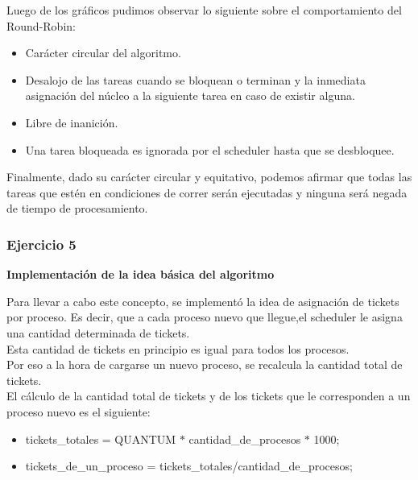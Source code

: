\indent Luego de los gráficos pudimos observar lo siguiente sobre el comportamiento  del Round-Robin:\\
\begin{itemize}
\item  Carácter circular del algoritmo.
\item  Desalojo de las tareas cuando se bloquean o terminan y la inmediata asignación del núcleo a la siguiente tarea en caso de existir alguna.
\item  Libre de inanición.
\item  Una tarea bloqueada es ignorada por el scheduler hasta que se desbloquee.
\end{itemize}

\indent Finalmente, dado su carácter circular y equitativo, podemos afirmar que todas las tareas que 
estén en condiciones de correr serán ejecutadas y ninguna será negada de tiempo de procesamiento.\\

\subsubsection[Resolución Ejercicio 5]{Ejercicio 5}

\begin{center}
\textbf{Implementación de la idea básica del algoritmo} 
\end{center}


\indent Para llevar a cabo este concepto, se implementó la idea de asignación de tickets por proceso. 
Es decir, que a cada proceso nuevo que llegue,el scheduler le asigna una cantidad determinada de tickets. \\
Esta cantidad de tickets en principio es igual para todos los procesos.\\
Por eso a la hora de cargarse un nuevo proceso, se recalcula la cantidad total de tickets.\\

\indent El cálculo de la cantidad total de tickets y de los tickets que le corresponden a un proceso nuevo es el siguiente:\\
\begin{itemize}
 \item tickets\_totales = QUANTUM $*$ cantidad\_de\_procesos $*$ 1000;
 \item tickets\_de\_un\_proceso = tickets\_totales/cantidad\_de\_procesos;
\end{itemize}

